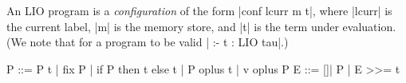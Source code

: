 An LIO program is a \emph{configuration} of the form
|conf lcurr m t|, where |lcurr| is the current label, |m|
is the memory store, and |t| is
the term under evaluation.
%
(We note that for a program to be valid | :- t : LIO tau|.)



\begin{code}
P ::= P t | fix P | if P then t else t | P oplus t | v oplus P
E ::= []| P | E >>= t 
\end{code}

